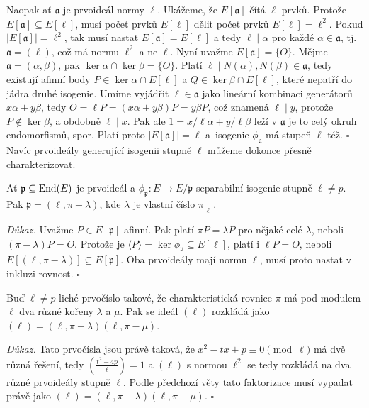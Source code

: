 \documentclass[12pt]{report}
\begin{document}
Naopak ať $\mathfrak{a}$ je prvoideál normy $\ell$. Ukážeme, že $E[\mathfrak{a}]$ čítá $\ell$ prvků. Protože $E[\mathfrak{a}] \subseteq E[\ell]$, musí počet prvků $E[\ell]$ dělit počet prvků $E[\ell] = \ell^2$. Pokud $\vert E[\mathfrak{a}] \vert = \ell^2$, tak musí nastat $E[\mathfrak{a}] = E[\ell]$ a tedy $\ell \mid \alpha$ pro každé $\alpha \in \mathfrak{a}$, tj. $\mathfrak{a} = (\ell)$, což má normu $\ell^2$ a ne $\ell$. Nyní uvažme $E[\mathfrak{a}] = \lbrace O \rbrace$. Mějme $\mathfrak{a} = (\alpha,\beta)$, pak $\ker \alpha \cap \ker \beta = \lbrace O \rbrace$. Platí $\ell \mid N(\alpha),N(\beta) \in \mathfrak{a}$, tedy existují afinní body $P \in \ker \alpha \cap E[\ell]$ a $Q \in \ker \beta \cap E[\ell]$, které nepatří do jádra druhé isogenie. Umíme vyjádřit $\ell \in \mathfrak{a}$ jako lineární kombinaci generátorů $x \alpha + y \beta$, tedy $O = \ell P = (x \alpha + y \beta) P  = y \beta P$, což znamená $\ell \mid y$, protože $P \not\in \ker \beta$, a obdobně $\ell \mid x$. Pak ale $1 = x/\ell \alpha + y/\ell \beta$ leží v $\mathfrak{a}$ je to celý okruh endomorfismů, spor. Platí proto $\vert E[\mathfrak{a}] \vert = \ell$ a~isogenie $\phi_\mathfrak{a}$ má stupeň $\ell$ též. \hfill $\square$\\

Navíc prvoideály generující isogenii stupně $\ell$ můžeme dokonce přesně charakterizovat.

\begin{veta}
Ať $\mathfrak{p} \subseteq \operatorname{End}(E)$ je prvoideál a $\phi_{\mathfrak{p}} : E \longrightarrow E/\mathfrak{p}$ separabilní isogenie stupně $\ell \neq p$. Pak $\mathfrak{p} = (\ell, \pi - \lambda)$, kde $\lambda$ je vlastní číslo $\pi \vert_{\ell}$ .
\end{veta}
\noindent \textit{Důkaz.} Uvažme $P \in E[\mathfrak{p}]$ afinní. Pak platí $\pi P = \lambda P$ pro nějaké celé $\lambda$, neboli $(\pi - \lambda) P = O$. Protože je $\langle P \rangle = \ker \phi_{\mathfrak{p}} \subseteq E[\ell]$, platí i $\ell P = O$, neboli $E[(\ell,\pi-\lambda)] \subseteq E[\mathfrak{p}]$. Oba prvoideály mají normu $\ell$, musí proto nastat v inkluzi rovnost.  \hfill $\square$\\ 

\begin{dusledek}\label{duslodok}
Buď $\ell \neq p$ liché prvočíslo takové, že charakteristická rovnice $\pi$ má pod modulem $\ell$ dva různé kořeny $\lambda$ a $\mu$. Pak se ideál $(\ell)$ rozkládá jako $(\ell) = (\ell,\pi - \lambda)(\ell, \pi - \mu)$.
\end{dusledek}
\noindent \textit{Důkaz.} Tato prvočísla jsou právě taková, že $x^2 - tx + p \equiv 0 \pmod{\ell}$ má dvě různá řešení, tedy $\genfrac{(}{)}{}{}{t^2-4p}{\ell} = 1$ a $(\ell)$ s normou $\ell^2$ se tedy rozkládá na dva různé prvoideály stupně $\ell$. Podle předchozí věty tato faktorizace musí vypadat právě jako $(\ell) = (\ell,\pi-\lambda)(\ell,\pi-\mu)$. \hfill $\square$\\
\end{document}
